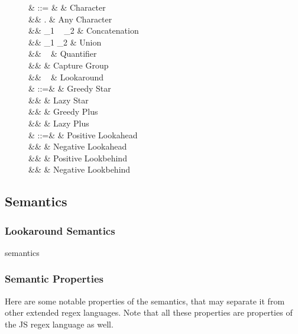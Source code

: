 \documentclass{article}
\renewcommand\cite\citep
\def\regex#1{\lstinline[style=rgx]{#1}}
\def\tregex#1{\text{\regex{#1}}}
\def\todo#1{{\color{ACMOrange}{TODO: }}#1}
\begin{document}
\begin{figure}[h]
  \begin{syntax}
\re & ::= & \char & Character \\
&\mid& . & Any Character\\
&\mid& \re_1 ~ \re_2 & Concatenation\\
&\mid& \re_1 \tregex{|} \re_2 & Union\\
&\mid&  \re ~ \quant & Quantifier \\
&\mid&  \tregex{(}\re\tregex{)} & Capture Group \\
&\mid& \tregex{(}\look~\re\tregex{)} & Lookaround \\
%
\quant & ::=& \tregex{*} & Greedy Star\\
&\mid& \tregex{*?} & Lazy Star\\
&\mid& \tregex{+} & Greedy Plus\\
&\mid& \tregex{+?} & Lazy Plus\\
%
\look & ::=& \tregex{?=} & Positive Lookahead\\
&\mid& \tregex{?!} & Negative Lookahead\\
&\mid& \tregex{?<=} & Positive Lookbehind\\
&\mid& \tregex{?<!} & Negative Lookbehind\\
  \end{syntax}
\end{figure}

\subsection{Semantics}
\subsubsection{Lookaround Semantics}
\todo{semantics}
\cite{ecma_262}\cite{rewla}


\subsubsection{Semantic Properties}
Here are some notable properties of the semantics, that may separate it from other extended regex languages.
Note that all these properties are properties of the JS regex language as well.
\end{document}
